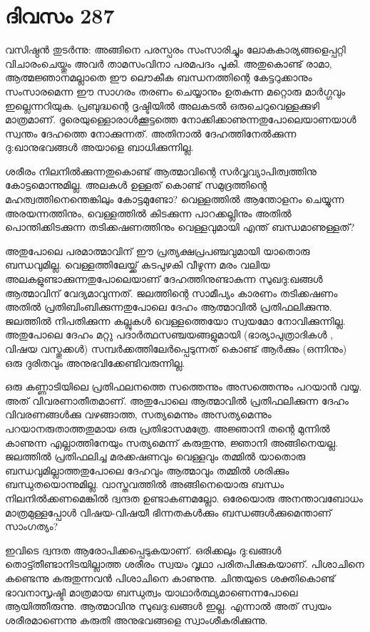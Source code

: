 \section{ദിവസം 287}


വസിഷ്ഠന്‍ തുടര്‍ന്നു: അങ്ങിനെ പരസ്പരം സംസാരിച്ചും ലോകകാര്യങ്ങളെപ്പറ്റി വിചാരംചെയ്തും അവര്‍ താമസംവിനാ പരമപദം പൂകി. അതുകൊണ്ട് രാമാ, ആത്മജ്ഞാനമല്ലാതെ ഈ ലൌകീക ബന്ധനത്തിന്റെ കേട്ടറുക്കാനും സംസാരമെന്ന ഈ സാഗരം തരണം ചെയ്യാനും  ഉതകുന്ന മറ്റൊരു മാര്‍ഗ്ഗവും ഇല്ലെന്നറിയുക. പ്രബുദ്ധന്റെ ദൃഷ്ടിയില്‍ അലകടല്‍ ഒരുചെറുവെള്ളക്കുഴി മാത്രമാണ്. ദൂരെയുള്ളൊരാള്‍ക്കൂട്ടത്തെ നോക്കിക്കാണുന്നതുപോലെയാണയാള്‍ സ്വന്തം ദേഹത്തെ നോക്കുന്നത്. അതിനാല്‍ ദേഹത്തിനേല്‍ക്കുന്ന ദു:ഖാനുഭവങ്ങള്‍ അയാളെ ബാധിക്കുന്നില്ല. 

ശരീരം നിലനില്‍ക്കുന്നതുകൊണ്ട് ആത്മാവിന്റെ സര്‍വ്വവ്യാപിത്വത്തിനു കോട്ടമൊന്നുമില്ല. അലകള്‍ ഉള്ളത് കൊണ്ട് സമുദ്രത്തിന്റെ മഹത്വത്തിനെന്തെങ്കിലും കോട്ടമുണ്ടോ? വെള്ളത്തില്‍ ആന്തോളനം ചെയ്യുന്ന അരയന്നത്തിനും, വെള്ളത്തില്‍ കിടക്കുന്ന പാറക്കല്ലിനും അതില്‍ പൊന്തിക്കിടക്കുന്ന തടിക്കഷണത്തിനും വെള്ളവുമായി എന്ത് ബന്ധമാണുള്ളത്?    

അതുപോലെ പരമാത്മാവിന് ഈ പ്രത്യക്ഷപ്രപഞ്ചവുമായി യാതൊരു ബന്ധവുമില്ല. വെള്ളത്തിലേയ്ക്ക് കടപുഴകി വീഴുന്ന മരം വലിയ അലകളുണ്ടാക്കുന്നതുപോലെയാണ് ദേഹത്തിനുണ്ടാകുന്ന സുഖദു:ഖങ്ങള്‍ ആത്മാവിന് വേദ്യമാവുന്നത്. ജലത്തിന്റെ സാമീപ്യം കാരണം തടിക്കഷണം അതില്‍ പ്രതിബിംബിക്കുന്നതുപോലെ ദേഹം ആത്മാവില്‍ പ്രതിഫലിക്കുന്നു. ജലത്തില്‍ നിപതിക്കുന്ന കല്ലുകള്‍ വെള്ളത്തെയോ സ്വയമോ നോവിക്കുന്നില്ല. അതുപോലെ ദേഹം മറ്റു പദാര്‍ത്ഥസഞ്ചയങ്ങളുമായി (ഭാര്യാപുത്രാദികള്‍ , വിഷയ വസ്തുക്കള്‍) സമ്പര്‍ക്കത്തിലേര്‍പ്പെടുന്നത് കൊണ്ട് ആര്‍ക്കും (ഒന്നിനും) ഒരു ദുരിതവും അനുഭവിക്കേണ്ടിവരുന്നില്ല.  

ഒരു കണ്ണാടിയിലെ പ്രതിഫലനത്തെ സത്തെന്നും അസത്തെന്നും പറയാന്‍ വയ്യ. അത് വിവരണാതീതമാണ്. അതുപോലെ ആത്മാവില്‍ പ്രതിഫലിക്കുന്ന ദേഹം വിവരണങ്ങള്‍ക്കു വഴങ്ങാത്ത, സത്യമെന്നും അസത്യമെന്നും പറയാനരുതാത്തതുമായ  ഒരു പ്രതിഭാസമത്രേ. അജ്ഞാനി തന്റെ മുന്നില്‍ കാണുന്ന എല്ലാത്തിനേയും സത്യമെന്ന് കരുതുന്നു, ജ്ഞാനി അങ്ങിനെയല്ല. ജലത്തില്‍ പ്രതിഫലിച്ച മരക്കഷണവും വെള്ളവും തമ്മില്‍ യാതൊരു ബന്ധവുമില്ലാത്തതുപോലെ  ദേഹവും ആത്മാവും തമ്മില്‍ ശരിക്കും ബന്ധുതയൊന്നുമില്ല. വാസ്തവത്തില്‍ അങ്ങിനെയൊരു ബന്ധം നിലനില്‍ക്കണമെങ്കില്‍ ദ്വന്ദത ഉണ്ടാകണമല്ലോ. ഒരേയൊരു അനന്താവബോധം മാത്രമുള്ളപ്പോള്‍ വിഷയ-വിഷയീ ഭിന്നതകള്‍ക്കും  ബന്ധങ്ങള്‍ക്കുമെന്താണ് സാംഗത്യം? 

ഇവിടെ ദ്വന്ദത ആരോപിക്കപ്പെടുകയാണ്. ഒരിക്കലും ദു:ഖങ്ങള്‍ തൊട്ട്തീണ്ടാനിടയില്ലാത്ത ശരീരം സ്വയം വൃഥാ പരിതപിക്കുകയാണ്. പിശാചിനെ കണ്ടെന്നു കരുതുന്നവന്‍ പിശാചിനെ കാണുന്നു. ചിന്തയുടെ ശക്തികൊണ്ട് ഭാവനാസൃഷ്ടി മാത്രമായ ബന്ധുത്വം യാഥാര്‍ത്ഥ്യമാണെന്നപോലെ ആയിത്തീരുന്നു. ആത്മാവിനു സുഖദു:ഖങ്ങള്‍ ഇല്ല. എന്നാല്‍ അത് സ്വയം ശരീരമാണെന്നു കരുതി അനുഭവങ്ങളെ സ്വാംശീകരിക്കുന്നു.

